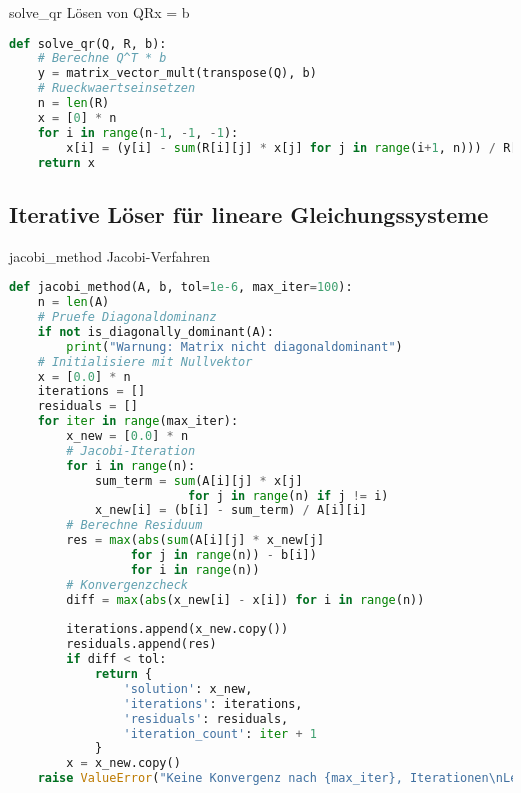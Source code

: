 \begin{examplecode}{solve\_qr} Lösen von QRx = b
\begin{lstlisting}[language=Python, style=basesmol]
def solve_qr(Q, R, b):
    # Berechne Q^T * b
    y = matrix_vector_mult(transpose(Q), b)
    # Rueckwaertseinsetzen
    n = len(R)
    x = [0] * n
    for i in range(n-1, -1, -1):
        x[i] = (y[i] - sum(R[i][j] * x[j] for j in range(i+1, n))) / R[i][i]
    return x
\end{lstlisting}
\end{examplecode}

\subsection{Iterative Löser für lineare Gleichungssysteme}

\begin{examplecode}{jacobi\_method} Jacobi-Verfahren
\begin{lstlisting}[language=Python, style=basesmol]
def jacobi_method(A, b, tol=1e-6, max_iter=100):
    n = len(A)
    # Pruefe Diagonaldominanz
    if not is_diagonally_dominant(A):
        print("Warnung: Matrix nicht diagonaldominant")
    # Initialisiere mit Nullvektor
    x = [0.0] * n
    iterations = []
    residuals = []
    for iter in range(max_iter):
        x_new = [0.0] * n
        # Jacobi-Iteration
        for i in range(n):
            sum_term = sum(A[i][j] * x[j] 
                         for j in range(n) if j != i)
            x_new[i] = (b[i] - sum_term) / A[i][i]
        # Berechne Residuum
        res = max(abs(sum(A[i][j] * x_new[j] 
                 for j in range(n)) - b[i]) 
                 for i in range(n))
        # Konvergenzcheck
        diff = max(abs(x_new[i] - x[i]) for i in range(n))
        
        iterations.append(x_new.copy())
        residuals.append(res)
        if diff < tol:
            return {
                'solution': x_new,
                'iterations': iterations,
                'residuals': residuals,
                'iteration_count': iter + 1
            }
        x = x_new.copy()
    raise ValueError("Keine Konvergenz nach {max_iter}, Iterationen\nLetztes Residuum: {res}")
\end{lstlisting}
\end{examplecode}


